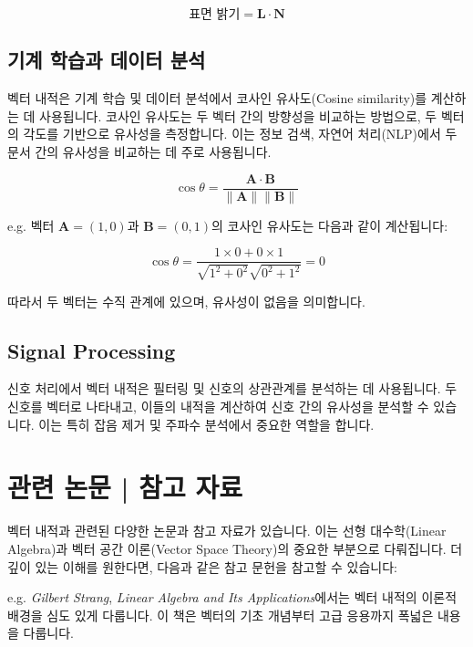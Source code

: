 \documentclass[12pt]{article}
\begin{document}
\[
  \text{표면 밝기} = \mathbf{L} \cdot \mathbf{N}
\]

\subsection{기계 학습과 데이터 분석}

\noindent 벡터 내적은 기계 학습 및 데이터 분석에서 코사인 유사도(Cosine similarity)를 계산하는 데 사용됩니다. 코사인 유사도는 두 벡터 간의 방향성을 비교하는 방법으로, 두 벡터의 각도를 기반으로 유사성을 측정합니다. 이는 정보 검색, 자연어 처리(NLP)에서 두 문서 간의 유사성을 비교하는 데 주로 사용됩니다.

\[
  \cos{\theta} = \frac{\mathbf{A} \cdot \mathbf{B}}{\|\mathbf{A}\| \|\mathbf{B}\|}
\]

\vspace{1\baselineskip}
\noindent {} e.g. 벡터 \( \mathbf{A} = (1, 0) \)과 \( \mathbf{B} = (0, 1) \)의 코사인 유사도는 다음과 같이 계산됩니다:

\[
  \cos{\theta} = \frac{1 \times 0 + 0 \times 1}{\sqrt{1^2 + 0^2} \sqrt{0^2 + 1^2}} = 0
\]

\noindent 따라서 두 벡터는 수직 관계에 있으며, 유사성이 없음을 의미합니다.

\subsection{Signal Processing}

\noindent 신호 처리에서 벡터 내적은 필터링 및 신호의 상관관계를 분석하는 데 사용됩니다. 두 신호를 벡터로 나타내고, 이들의 내적을 계산하여 신호 간의 유사성을 분석할 수 있습니다. 이는 특히 잡음 제거 및 주파수 분석에서 중요한 역할을 합니다.


\section{관련 논문 | 참고 자료}

\noindent 벡터 내적과 관련된 다양한 논문과 참고 자료가 있습니다. 이는 선형 대수학(Linear Algebra)과 벡터 공간 이론(Vector Space Theory)의 중요한 부분으로 다뤄집니다. 더 깊이 있는 이해를 원한다면, 다음과 같은 참고 문헌을 참고할 수 있습니다:

\vspace{1\baselineskip}
\noindent {} e.g. \textit{Gilbert Strang}, \textit{Linear Algebra and Its Applications}에서는 벡터 내적의 이론적 배경을 심도 있게 다룹니다. 이 책은 벡터의 기초 개념부터 고급 응용까지 폭넓은 내용을 다룹니다.
\end{document}
